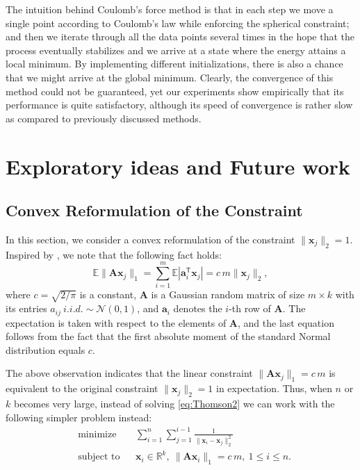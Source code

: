 \documentclass[11pt]{article}
\begin{document}
The intuition behind Coulomb's force method is that in each step we move a single point according to Coulomb's law while enforcing the spherical constraint; and then we iterate through all the data points several times in the hope that the process eventually stabilizes and we arrive at a state where the energy attains a local minimum. By implementing different initializations, there is also a chance that we might arrive at the global minimum. Clearly, the convergence of this method could not be guaranteed, yet our experiments show empirically that its performance is quite satisfactory, although its speed of convergence is rather slow as compared to previously discussed methods.

\section{Exploratory ideas and Future work}\label{sec:Explore}

\subsection{Convex Reformulation of the Constraint}

In this section, we consider a convex reformulation of the constraint $\|\bm{x}_j\|_2=1$. Inspired by \cite{PV2013}, we note that the following fact holds:
$$ \mathbb{E}\|\bm{A}\bm{x}_j\|_1 = \sum_{i=1}^m \mathbb{E}|\bm{a}_i^\mathsf{T}\bm{x}_j| = c\,m\|\bm{x}_j\|_2, $$
where $c = \sqrt{2/\pi}$ is a constant, $\bm{A}$ is a Gaussian random matrix of size $m\times k$ with its entries $a_{ij}\ i.i.d. \sim\mathcal{N}(0,1)$, and $\bm{a}_i$ denotes the $i$-th row of $\bm{A}$. The expectation is taken with respect to the elements of $\bm{A}$, and the last equation follows from the fact that the first absolute moment of the standard Normal distribution equals $c$.

The above observation indicates that the linear constraint $\|\bm{A}\bm{x}_j\|_1 = c\,m$ is equivalent to the original constraint $\|\bm{x}_j\|_2=1$  in expectation. Thus, when $n$ or $k$ becomes very large, instead of solving \eqref{eq:Thomson2} we can work with the following simpler problem instead:
\begin{equation}\label{eq:Thomson1}
\begin{aligned}
& \text{minimize}
& & \sum_{i=1}^n\sum_{j=1}^{i-1}\frac{1}{\|\bm{x}_i-\bm{x}_j\|_2^2} \\
& \text{subject to}
& & \bm{x}_i\in\mathbb{R}^k,\ \|\bm{A}\bm{x}_i\|_1 = c\,m,\ 1 \le i \le n.
\end{aligned}
\end{equation}
\end{document}
